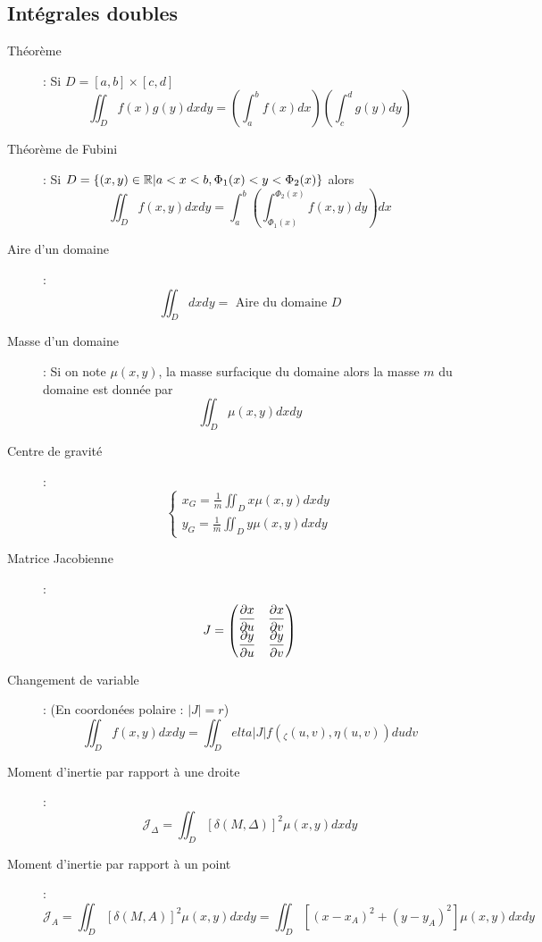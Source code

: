 \subsection{Intégrales doubles}
\begin{description}
\item[Théorème] : Si $D=[a,b]\times[c,d]$
    \[
        \iint_Df(x)g(y)dxdy=
        \left(\int_a^bf(x)dx\right)
        \left(\int_c^dg(y)dy\right)
    \]
\item[Théorème de Fubini] : Si $D=\{(x,y)\in\mathbb{R}|a<x<b,\Phi_1(x)<y<\Phi_2(x)\}$ alors
    \[
        \iint_Df(x,y)dxdy=
        \int_a^b\left(\int_{\Phi_1(x)}^{\Phi_2(x)}f(x,y)dy\right)dx
    \]
\item[Aire d'un domaine] :
    \[
        \iint_Ddxdy=\textrm{ Aire du domaine }D
    \]
\item[Masse d'un domaine] : Si on note $\mu(x,y)$, la masse surfacique du domaine alors la masse $m$ du domaine est donnée par
    \[
        \iint_D\mu(x,y)dxdy
    \]
\item[Centre de gravité] :
    \[
        \begin{cases}
            x_G=\frac{1}{m}\iint_Dx\mu(x,y)dxdy\\
            y_G=\frac{1}{m}\iint_Dy\mu(x,y)dxdy
        \end{cases}
    \]
\item[Matrice Jacobienne] :
    \[
        J=\begin{pmatrix}
            \dfrac{\partial x}{\partial u} & \dfrac{\partial x}{\partial v}\\
            \dfrac{\partial y}{\partial u} & \dfrac{\partial y}{\partial v}\\
        \end{pmatrix}
    \]
\item[Changement de variable] : (En coordonées polaire : $|J|=r$)
    \[
        \iint_Df(x,y)dxdy=\iint_Delta|J|f(_\zeta(u,v),\eta(u,v))dudv
    \]
\item[Moment d'inertie par rapport à une droite] :
    \[
        \mathcal J_\Delta=
        \iint_D[\delta(M,\Delta)]^2\mu(x,y)dxdy
    \]
\item[Moment d'inertie par rapport à un point] :
    \[
        \mathcal J_A=
        \iint_D[\delta(M,A)]^2\mu(x,y)dxdy
        =\iint_D [(x-x_A)^2+(y-y_A)^2]\mu(x,y)dxdy
    \]
\end{description}
